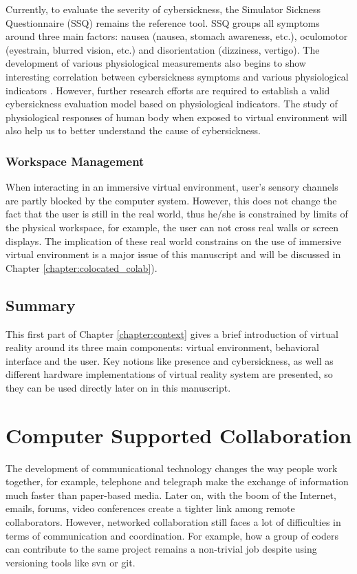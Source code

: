 Currently, to evaluate the severity of cybersickness, the Simulator Sickness Questionnaire (SSQ) \citep{Kennedy1993SSQ} remains the reference tool. SSQ groups all symptoms around three main factors: nausea (nausea, stomach awareness, etc.), oculomotor (eyestrain, blurred vision, etc.) and disorientation (dizziness, vertigo). The development of various physiological measurements also begins to show interesting correlation between cybersickness symptoms and various physiological indicators \citep{Kim2005Characteristic, Min2004Psycho, Sugita2008Quantitative}. However, further research efforts are required to establish a valid cybersickness evaluation model based on physiological indicators. The study of physiological responses of human body when exposed to virtual environment will also help us to better understand the cause of cybersickness.

\subsubsection{Workspace Management}
When interacting in an immersive virtual environment, user's sensory channels are partly blocked by the computer system. However, this does not change the fact that the user is still in the real world, thus he/she is constrained by limits of the physical workspace, for example, the user can not cross real walls or screen displays. The implication of these real world constrains on the use of immersive virtual environment is a major issue of this manuscript and will be discussed in Chapter \ref{chapter:colocated_colab}).


\subsection{Summary}
This first part of Chapter \ref{chapter:context} gives a brief introduction of virtual reality around its three main components: virtual environment, behavioral interface and the user. Key notions like presence and cybersickness, as well as different hardware implementations of virtual reality system are presented, so they can be used directly later on in this manuscript. 

\newpage

\section{Computer Supported Collaboration}
The development of communicational technology changes the way people work together, for example, telephone and telegraph make the exchange of information much faster than paper-based media. Later on, with the boom of the Internet, emails, forums, video conferences create a tighter link among remote collaborators. However, networked collaboration still faces a lot of difficulties in terms of communication and coordination. For example, how a group of coders can contribute to the same project remains a non-trivial job despite using versioning tools like svn or git.

